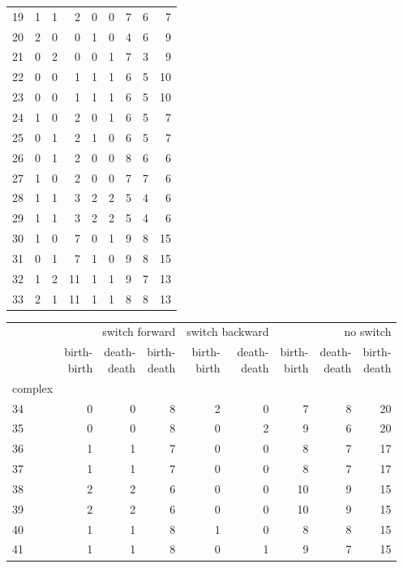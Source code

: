 \documentclass{article}
\begin{document}
\begin{center}
\begin{tabular}{lrrrrrrrr}
19 & 1 & 1 & 2 & 0 & 0 & 7 & 6 & 7 \\
20 & 2 & 0 & 0 & 1 & 0 & 4 & 6 & 9 \\
21 & 0 & 2 & 0 & 0 & 1 & 7 & 3 & 9 \\
22 & 0 & 0 & 1 & 1 & 1 & 6 & 5 & 10 \\
23 & 0 & 0 & 1 & 1 & 1 & 6 & 5 & 10 \\
24 & 1 & 0 & 2 & 0 & 1 & 6 & 5 & 7 \\
25 & 0 & 1 & 2 & 1 & 0 & 6 & 5 & 7 \\
26 & 0 & 1 & 2 & 0 & 0 & 8 & 6 & 6 \\
27 & 1 & 0 & 2 & 0 & 0 & 7 & 7 & 6 \\
28 & 1 & 1 & 3 & 2 & 2 & 5 & 4 & 6 \\
29 & 1 & 1 & 3 & 2 & 2 & 5 & 4 & 6 \\
30 & 1 & 0 & 7 & 0 & 1 & 9 & 8 & 15 \\
31 & 0 & 1 & 7 & 1 & 0 & 9 & 8 & 15 \\
32 & 1 & 2 & 11 & 1 & 1 & 9 & 7 & 13 \\
33 & 2 & 1 & 11 & 1 & 1 & 8 & 8 & 13 \\
\bottomrule
\end{tabular}

\begin{tabular}{lrrrrrrrr}
\toprule
& \multicolumn{3}{r}{switch forward} & \multicolumn{2}{r}{switch backward} & \multicolumn{3}{r}{no switch} \\
& \makecell{birth-\\birth} & \makecell{death-\\death} & \makecell{birth-\\death} & \makecell{birth-\\birth} & \makecell{death-\\death} & \makecell{birth-\\birth} & \makecell{death-\\death} & \makecell{birth-\\death} \\
complex &  &  &  &  &  &  &  &  \\
\midrule
34 & 0 & 0 & 8 & 2 & 0 & 7 & 8 & 20 \\
35 & 0 & 0 & 8 & 0 & 2 & 9 & 6 & 20 \\
36 & 1 & 1 & 7 & 0 & 0 & 8 & 7 & 17 \\
37 & 1 & 1 & 7 & 0 & 0 & 8 & 7 & 17 \\
38 & 2 & 2 & 6 & 0 & 0 & 10 & 9 & 15 \\
39 & 2 & 2 & 6 & 0 & 0 & 10 & 9 & 15 \\
40 & 1 & 1 & 8 & 1 & 0 & 8 & 8 & 15 \\
41 & 1 & 1 & 8 & 0 & 1 & 9 & 7 & 15 \\
\bottomrule
\end{tabular}

\end{center}
\end{document}
